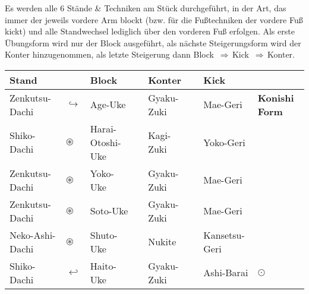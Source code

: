 	\null\vfill\null
	\begin{center}
		\parbox{\textwidth-2\tabcolsep}{Es werden alle 6 Stände \& Techniken am Stück durchgeführt, in der Art, das immer der jeweils vordere Arm blockt (bzw. für die Fußtechniken der vordere Fuß kickt) und alle Standwechsel lediglich über den vorderen Fuß erfolgen. Als erste Übungsform wird nur der Block ausgeführt, als nächste Steigerungsform wird der Konter hinzugenommen, als letzte Steigerung dann \mbox{Block \(\Rightarrow\)\,Kick \(\Rightarrow\)\,Konter.}}
	\end{center}
	\begin{tabularx}{\textwidth}{lllXlXll}
		Stand	&&Block	&&Konter	&&Kick&\\
		\midrule
		Zenkutsu-Dachi 	& \(\hookrightarrow\) & Age-Uke	&&Gyaku-Zuki	&&Mae-Geri&\textbf{Konishi Form}\\
		Shiko-Dachi 	& \(\circledast\) & Harai-Otoshi-Uke	&&Kagi-Zuki&&Yoko-Geri&\\
		Zenkutsu-Dachi	& \(\circledast\) & Yoko-Uke	&&Gyaku-Zuki&&Mae-Geri&\\
		Zenkutsu-Dachi	& \(\circledast\) & Soto-Uke	&&Gyaku-Zuki&&Mae-Geri&\\
		Neko-Ashi-Dachi	& \(\circledast\) & Shuto-Uke	&&Nukite&&Kansetsu-Geri&\\
		Shiko-Dachi	& \(\hookleftarrow\) & Haito-Uke	&&Gyaku-Zuki&&Ashi-Barai& \(\odot\)\\
		\midrule
	\end{tabularx}\\\null\vfill\null